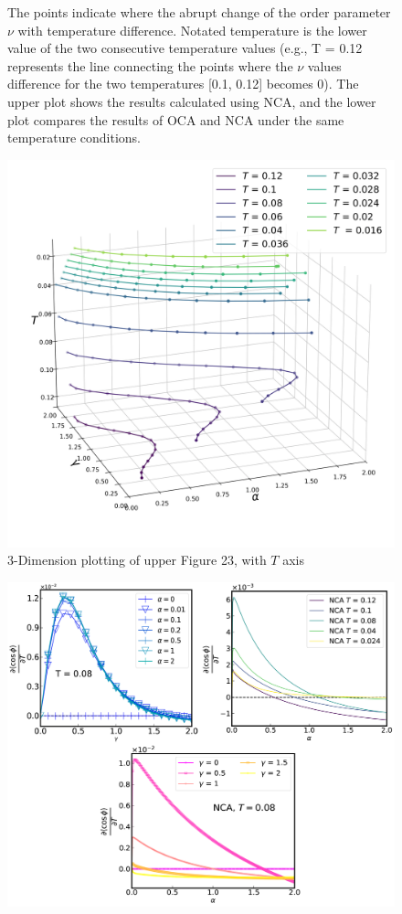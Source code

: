 \documentclass{article}[12pt]
\begin{document}
\begin{spacing}{1.5}
\begin{figure}[H]
  \caption{The points indicate where the abrupt change of the order parameter $\nu$ with temperature difference. 
  Notated temperature is the lower value of the two consecutive temperature values 
  (e.g., T = 0.12 represents the line connecting the points where the $\nu$ values 
  difference for the two temperatures [0.1, 0.12] becomes 0). The upper plot shows the results calculated using NCA, 
  and the lower plot compares the results of OCA and NCA under the same temperature conditions.}
   \label{2Dplot}
\end{figure}
\begin{figure}[H]
  \centerline{\includegraphics[width=17cm]{TexFigure/4/4_3_10_3dplot_Ns3_proj_20-1.png}}
  \caption{3-Dimension plotting of upper Figure 23, with $T$ axis}%
\end{figure}
\pagebreak
\begin{figure}[H]
  \vfill
  \centering
  \centerline{\includegraphics[width=15cm]{TexFigure/4/4_3_11_1D_follow.png}}

\end{figure}
\end{spacing}
\end{document}
